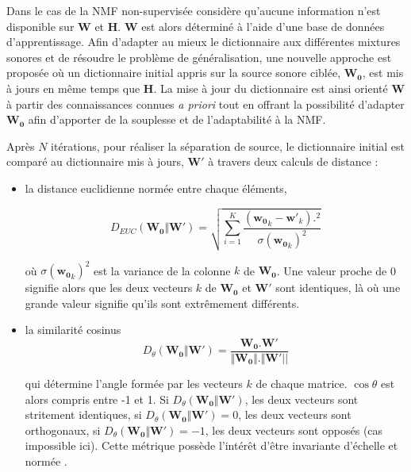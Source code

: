 Dans le cas de la NMF non-supervisée considère qu'aucune information n'est disponible sur $\mathbf{W}$ et $\mathbf{H}$. $\mathbf{W}$ est alors déterminé à l'aide d'une base de données d'apprentissage. 
Afin d'adapter au mieux le dictionnaire aux différentes mixtures sonores et de résoudre le problème de généralisation, une nouvelle approche est proposée où un dictionnaire initial appris sur la source sonore ciblée, $\mathbf{W_0}$, est mis à jours en même temps que $\mathbf{H}$. La mise à jour du dictionnaire est ainsi orienté $\mathbf{W}$ à partir des connaissances connues \textit{a priori} tout en offrant la possibilité d'adapter $\mathbf{W_0}$ afin d'apporter de la souplesse et de l'adaptabilité à la NMF. 


Après $N$ itérations, pour réaliser la séparation de source, le dictionnaire initial est comparé au dictionnaire mis à jours, $\mathbf{W'}$ à travers deux calculs de distance : 
\begin{itemize}
\item la distance euclidienne normée entre chaque éléments, 

\begin{equation}
D_{EUC}(\mathbf{W_0}\Vert\mathbf{W'}) = \sqrt{\sum_{i = 1}^K\frac{(\mathbf{w_0}_k-\mathbf{w'}_k).^2}{\sigma(\mathbf{w_0}_k)^2}}
\end{equation}

où $\sigma(\mathbf{w_0}_k)^2$ est la variance de la colonne $k$ de $\mathbf{W_0}$. Une valeur proche de 0 signifie alors que les deux vecteurs $k$ de $\mathbf{W_0}$ et $\mathbf{W'}$ sont identiques, là où une grande valeur signifie qu'ils sont extrêmement différents. 

\item la similarité cosinus
 \begin{equation}
 D_{\theta}(\mathbf{W_0}\Vert\mathbf{W'}) = \frac{\mathbf{W_0}.\mathbf{W'}}{\Vert\mathbf{W_0}  \Vert. \Vert\mathbf{W'} \vert \vert}
 \end{equation}
 
 qui détermine l'angle formée par les vecteurs $k$ de chaque matrice. $\cos \theta$ est alors compris entre -1 et 1. Si $D_{\theta}(\mathbf{W_0}\Vert\mathbf{W'})$, les deux vecteurs sont stritement identiques, si $D_{\theta}(\mathbf{W_0}\Vert\mathbf{W'}) = 0$, les deux vecteurs sont orthogonaux, si $D_{\theta}(\mathbf{W_0}\Vert\mathbf{W'}) = -1$, les deux vecteurs sont opposés (cas impossible ici). Cette métrique possède l'intérêt d'être invariante d'échelle et normée .\\
\end{itemize}
 
